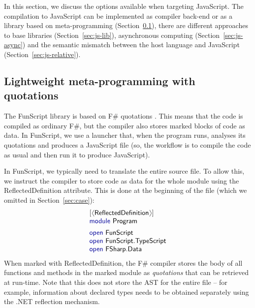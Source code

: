 \documentclass[submission,copyright,creativecommons]{eptcs}
\newcommand{\langl}{\begin{picture}(4.5,7)
\put(1.1,2.5){\rotatebox{60}{\line(1,0){5.5}}}
\put(1.1,2.5){\rotatebox{300}{\line(1,0){5.5}}}
\end{picture}}
\newcommand{\rangl}{\begin{picture}(4.5,7)
\put(.9,2.5){\rotatebox{120}{\line(1,0){5.5}}}
\put(.9,2.5){\rotatebox{240}{\line(1,0){5.5}}}
\end{picture}}
\newcommand{\kvd}[1]{\textnormal{\textcolor{kvdclr}{\sffamily #1}}}
\newcommand{\ident}[1]{\textnormal{\sffamily #1}}
\begin{document}
In this section, we discuss the options available when targeting JavaScript. The compilation to
JavaScript can be implemented as compiler back-end or as a library based on meta-programming
(Section~\ref{sec:js-meta}), there are different approaches to base libraries (Section~\ref{sec:js-lib}),
asynchronous computing (Section~\ref{sec:js-async}) and the semantic mismatch between the host
language and JavaScript (Section~\ref{sec:js-relative}).

\subsection{Lightweight meta-programming with quotations}
\label{sec:js-meta}

The FunScript library is based on F\# quotations \cite{fsharp-metaprog}. This means that the code
is compiled as ordinary F\#, but the compiler also stores marked blocks of code as data. In FunScript,
we use a launcher that, when the program runs, analyses its quotations and produces a JavaScript file
(so, the workflow is to compile the code as usual and then run it to produce JavaScript).

In FunScript, we typically need to translate the entire source file. To allow this, we instruct the
compiler to store code as data for the whole module using the \ident{ReflectedDefinition} attribute.
This is done at the beginning of the file (which we omitted in Section~\ref{sec:case}):
%
\begin{equation*}
\begin{array}{l}
 \lbrack\langl\ident{ReflectedDefinition}\rangl\rbrack \\
 \kvd{module}~\ident{Program}
 \\[0.5em]
 \kvd{open}~\ident{FunScript} \\
 \kvd{open}~\ident{FunScript.TypeScript} \\
 \kvd{open}~\ident{FSharp.Data}
\end{array}
\end{equation*}
%
When marked with \ident{ReflectedDefinition}, the F\# compiler stores the body of all functions and
methods in the marked module as \emph{quotations} that can be retrieved at run-time. Note that this does
not store the AST for the entire file -- for example, information about declared types needs to be
obtained separately using the .NET reflection mechanism.
\end{document}
